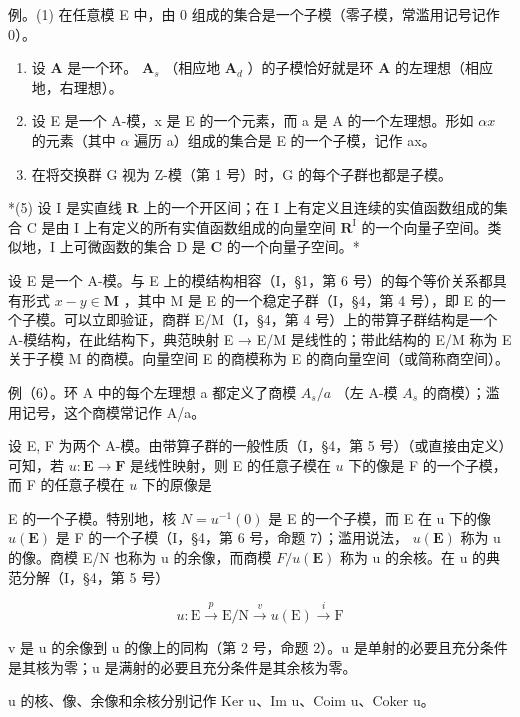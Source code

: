 例。(1) 在任意模 E 中，由 0 组成的集合是一个子模（零子模，常滥用记号记作 0）。

\begin{enumerate}
\def\labelenumi{(\arabic{enumi})}
\setcounter{enumi}{1}
\item
  设 \(\mathbf{A}\) 是一个环。 \(\mathbf{A}_s\) （相应地 \(\mathbf{A}_d\) ）的子模恰好就是环 \(\mathbf{A}\) 的左理想（相应地，右理想）。
\item
  设 E 是一个 A-模，x 是 E 的一个元素，而 a 是 A 的一个左理想。形如 \(\alpha x\) 的元素（其中 \(\alpha\) 遍历 a）组成的集合是 E 的一个子模，记作 ax。
\item
  在将交换群 G 视为 Z-模（第 1 号）时，G 的每个子群也都是子模。
\end{enumerate}

*(5) 设 I 是实直线 \(\mathbf{R}\) 上的一个开区间；在 I 上有定义且连续的实值函数组成的集合 C 是由 I 上有定义的所有实值函数组成的向量空间 \(\mathbf{R}^{\mathrm{I}}\) 的一个向量子空间。类似地，I 上可微函数的集合 D 是 \(\mathbf{C}\) 的一个向量子空间。*

设 E 是一个 A-模。与 E 上的模结构相容（I，§1，第 6 号）的每个等价关系都具有形式 \(x - y \in \mathbf{M}\) ，其中 M 是 E 的一个稳定子群（I，§4，第 4 号），即 E 的一个子模。可以立即验证，商群 E/M（I，§4，第 4 号）上的带算子群结构是一个 A-模结构，在此结构下，典范映射 E → E/M 是线性的；带此结构的 E/M 称为 E 关于子模 M 的商模。向量空间 E 的商模称为 E 的商向量空间（或简称商空间）。

例（6）。环 A 中的每个左理想 a 都定义了商模 \(A_{s}/a\) （左 A-模 \(A_{s}\) 的商模）；滥用记号，这个商模常记作 A/a。

设 E, F 为两个 A-模。由带算子群的一般性质（I，§4，第 5 号）（或直接由定义）可知，若 \(u: \mathbf{E} \to \mathbf{F}\) 是线性映射，则 E 的任意子模在 \(u\) 下的像是 F 的一个子模，而 F 的任意子模在 \(u\) 下的原像是

E 的一个子模。特别地，核 \(N = u^{-1}(0)\) 是 E 的一个子模，而 E 在 u 下的像 \(u(\mathbf{E})\) 是 F 的一个子模（I，§4，第 6 号，命题 7）；滥用说法， \(u(\mathbf{E})\) 称为 u 的像。商模 E/N 也称为 u 的余像，而商模 \(F/u(\mathbf{E})\) 称为 u 的余核。在 u 的典范分解（I，§4，第 5 号）

\[
u: \mathrm{E} \xrightarrow {p} \mathrm{E} / \mathrm{N} \xrightarrow {v} u (\mathrm{E}) \xrightarrow {i} \mathrm{F}\tag{11}
\]

v 是 u 的余像到 u 的像上的同构（第 2 号，命题 2）。u 是单射的必要且充分条件是其核为零；u 是满射的必要且充分条件是其余核为零。

u 的核、像、余像和余核分别记作 Ker u、Im u、Coim u、Coker u。

